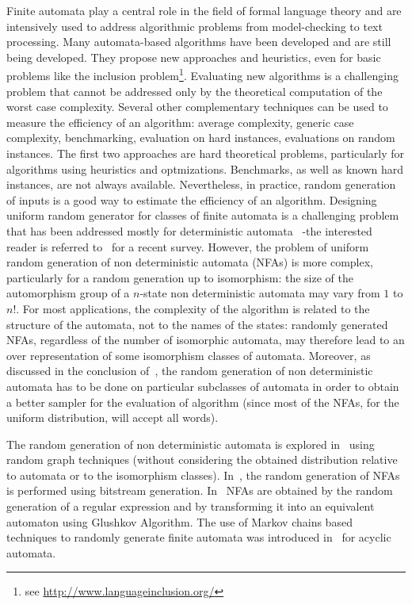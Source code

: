 

Finite automata play a central role in the field of formal language
theory and are intensively used to address algorithmic problems from
model-checking to text processing. Many automata-based algorithms have been
developed and are still  being developed. They propose new approaches and heuristics,
even for basic problems like the inclusion
problem\footnote{see \url{http://www.languageinclusion.org/}}.
Evaluating new algorithms is a challenging problem that cannot be addressed
only by the theoretical computation of the worst case complexity. Several
other complementary techniques can be used to measure the efficiency of an
algorithm: average complexity, generic case complexity, benchmarking,
evaluation on hard instances, evaluations on random instances. The first two
approaches are hard theoretical problems, particularly for algorithms
using heuristics and optmizations. Benchmarks, as well as known hard instances, are not always available. 
Nevertheless, in practice, random generation
of inputs is a good way to estimate the efficiency of an algorithm.
Designing uniform random generator for classes of finite automata is a
challenging problem that has been addressed mostly for deterministic
automata~\cite{DBLP:journals/tcs/ChamparnaudP05,DBLP:journals/tcs/BassinoN07,DBLP:journals/tcs/AlmeidaMR07,DBLP:conf/stacs/CarayolN12}
 -the interested reader is referred to~\cite{DBLP:conf/mfcs/Nicaud14} for a
recent survey. However, the problem of uniform random generation of non
deterministic automata (NFAs) is more complex, particularly for a random generation
up to isomorphism: the size of the automorphism group of a $n$-state non
deterministic automata may vary from $1$ to $n!$. 
For most applications, the complexity of the algorithm is related to the
structure of the automata, not to the names of the states:
randomly generated NFAs, regardless of the number of isomorphic automata, may therefore 
lead to an over representation of some isomorphism classes of automata.
Moreover, as discussed in the conclusion of~\cite{DBLP:conf/mfcs/Nicaud14},
the random generation of non deterministic automata has to be done on particular
subclasses of automata in order to obtain a better sampler for the
evaluation of algorithm (since most of the NFAs, for the uniform distribution,
will accept all words).  

The random generation of non deterministic automata is explored
in~\cite{DBLP:conf/lpar/TabakovV05} using random graph techniques (without
considering the obtained distribution relative to automata or to the
isomorphism classes). In~\cite{DBLP:conf/dcfs/ChamparnaudHPZ02}, the random
generation of NFAs is performed using bitstream generation.
In~\cite{DBLP:conf/lata/Nicaud09,DBLP:conf/fsttcs/NicaudPR10} NFAs are
obtained by the random generation of a regular expression and by
transforming it into an equivalent automaton using Glushkov Algorithm. The
use of Markov chains based techniques to randomly generate finite automata
was introduced
in~\cite{DBLP:conf/wia/CarninoF11,DBLP:journals/tcs/CarninoF12} for acyclic
automata.

